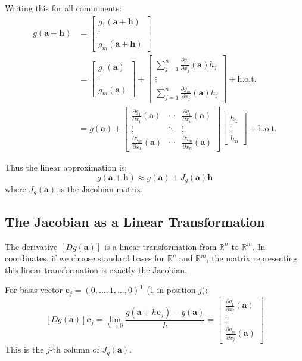 \begin{notechapter}
Writing this for all components:
\begin{align*}
g(\mathbf{a} + \mathbf{h}) &= 
\begin{bmatrix}
g_1(\mathbf{a} + \mathbf{h}) \\
\vdots \\
g_m(\mathbf{a} + \mathbf{h})
\end{bmatrix} \\
&= 
\begin{bmatrix}
g_1(\mathbf{a}) \\
\vdots \\
g_m(\mathbf{a})
\end{bmatrix}
+ 
\begin{bmatrix}
\sum_{j=1}^n \frac{\partial g_1}{\partial x_j}(\mathbf{a}) h_j \\
\vdots \\
\sum_{j=1}^n \frac{\partial g_m}{\partial x_j}(\mathbf{a}) h_j
\end{bmatrix}
+ \text{h.o.t.} \\
&= g(\mathbf{a}) + 
\begin{bmatrix}
\frac{\partial g_1}{\partial x_1}(\mathbf{a}) & \cdots & \frac{\partial g_1}{\partial x_n}(\mathbf{a}) \\
\vdots & \ddots & \vdots \\
\frac{\partial g_m}{\partial x_1}(\mathbf{a}) & \cdots & \frac{\partial
g_m}{\partial x_n}(\mathbf{a})
\end{bmatrix}
\begin{bmatrix}
h_1 \\
\vdots \\
h_n
\end{bmatrix}
+ \text{h.o.t.}
\end{align*}

Thus the linear approximation is:
\[
g(\mathbf{a} + \mathbf{h}) \approx g(\mathbf{a}) + J_g(\mathbf{a}) \mathbf{h}
\]
where $J_g(\mathbf{a})$ is the Jacobian matrix.

\subsection{The Jacobian as a Linear Transformation}
The derivative $[Dg(\mathbf{a})]$ is a linear transformation from $\mathbb{R}^n$
to $\mathbb{R}^m$. In coordinates, if we choose standard bases for
$\mathbb{R}^n$ and $\mathbb{R}^m$, the matrix representing this linear
transformation is exactly the Jacobian.

For basis vector $\mathbf{e}_j = (0,\dots,1,\dots,0)^\mathsf{T}$ (1 in position $j$):
\[
[Dg(\mathbf{a})]\mathbf{e}_j = \lim_{h \to 0} \frac{g(\mathbf{a} + h\mathbf{e}_j) - g(\mathbf{a})}{h} = 
\begin{bmatrix}
\frac{\partial g_1}{\partial x_j}(\mathbf{a}) \\
\vdots \\
\frac{\partial g_m}{\partial x_j}(\mathbf{a})
\end{bmatrix}
\]
This is the $j$-th column of $J_g(\mathbf{a})$.


\end{notechapter}
